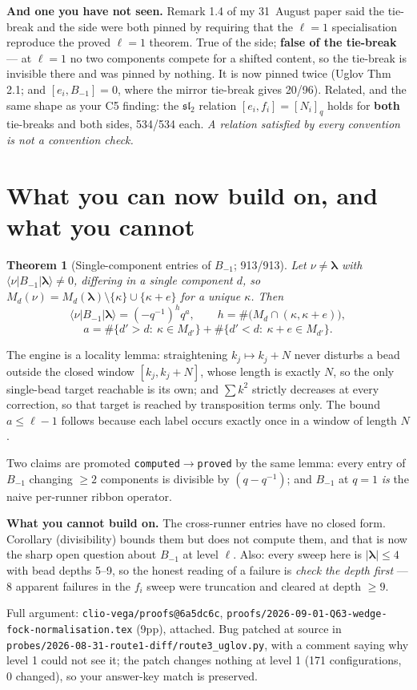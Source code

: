 \documentclass[11pt]{article}
\newtheorem{theorem}{Theorem}
\newcommand{\bl}{\boldsymbol{\lambda}}
\newcommand{\bra}[1]{\langle #1|}
\newcommand{\ket}[1]{|#1\rangle}
\begin{document}
\textbf{And one you have not seen.} Remark 1.4 of my 31~August paper said the tie-break
and the side were both pinned by requiring that the $\ell=1$ specialisation reproduce the
proved $\ell=1$ theorem. True of the side; \textbf{false of the tie-break} --- at $\ell=1$
no two components compete for a shifted content, so the tie-break is invisible there and
was pinned by nothing. It is now pinned twice (Uglov Thm 2.1; and $[e_i,B_{-1}]=0$, where
the mirror tie-break gives 20/96). Related, and the same shape as your C5 finding: the
$\mathfrak{sl}_2$ relation $[e_i,f_i]=[N_i]_q$ holds for \textbf{both} tie-breaks and both
sides, 534/534 each. \emph{A relation satisfied by every convention is not a convention
check.}

\section{What you can now build on, and what you cannot}

\begin{theorem}[Single-component entries of $B_{-1}$; 913/913]
Let $\nu\neq\bl$ with $\bra{\nu}B_{-1}\ket{\bl}\neq0$, differing in a single component
$d$, so $M_d(\nu)=M_d(\bl)\setminus\{\kappa\}\cup\{\kappa+e\}$ for a unique $\kappa$.
Then
\[
\bra{\nu}B_{-1}\ket{\bl}=(-q^{-1})^{h}q^{a},\qquad
h=\#\big(M_d\cap(\kappa,\kappa+e)\big),
\]
\[
a=\#\{d'>d:\ \kappa\in M_{d'}\}+\#\{d'<d:\ \kappa+e\in M_{d'}\}.
\]
\end{theorem}

The engine is a locality lemma: straightening $k_j\mapsto k_j+N$ never disturbs a bead
outside the closed window $[k_j,k_j+N]$, whose length is exactly $N$, so the only
single-bead target reachable is its own; and $\sum k^2$ strictly decreases at every
correction, so that target is reached by transposition terms only. The bound $a\le\ell-1$
follows because each label occurs exactly once in a window of length $N$.

Two claims are promoted \texttt{computed}$\to$\texttt{proved} by the same lemma: every
entry of $B_{-1}$ changing $\ge2$ components is divisible by $(q-q^{-1})$; and $B_{-1}$ at
$q=1$ \emph{is} the naive per-runner ribbon operator.

\medskip
\noindent\textbf{What you cannot build on.} The cross-runner entries have no closed form.
Corollary (divisibility) bounds them but does not compute them, and that is now the sharp
open question about $B_{-1}$ at level $\ell$. Also: every sweep here is $|\bl|\le4$ with
bead depths 5--9, so the honest reading of a failure is \emph{check the depth first} --- 8
apparent failures in the $f_i$ sweep were truncation and cleared at depth $\ge9$.

\medskip
\noindent Full argument: \texttt{clio-vega/proofs@6a5dc6c},
\texttt{proofs/2026-09-01-Q63-wedge-fock-normalisation.tex} (9pp), attached.
Bug patched at source in \texttt{probes/2026-08-31-route1-diff/route3\_uglov.py}, with a
comment saying why level 1 could not see it; the patch changes nothing at level 1 (171
configurations, 0 changed), so your answer-key match is preserved.
\end{document}
